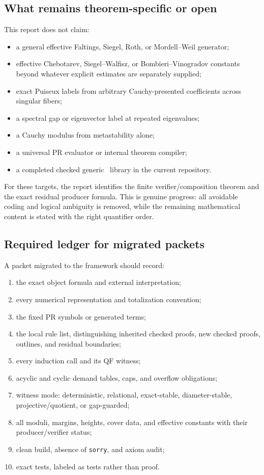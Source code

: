 \subsection{What remains theorem-specific or open}

This report does not claim:
\begin{itemize}
  \item a general effective Faltings, Siegel, Roth, or Mordell--Weil generator;
  \item effective Chebotarev, Siegel--Walfisz, or Bombieri--Vinogradov constants beyond whatever explicit estimates are separately supplied;
  \item exact Puiseux labels from arbitrary Cauchy-presented coefficients across singular fibers;
  \item a spectral gap or eigenvector label at repeated eigenvalues;
  \item a Cauchy modulus from metastability alone;
  \item a universal PR evaluator or internal theorem compiler;
  \item a completed checked generic \KIFCR\ library in the current repository.
\end{itemize}
For these targets, the report identifies the finite verifier/composition theorem and the exact residual producer formula.  This is genuine progress: all avoidable coding and logical ambiguity is removed, while the remaining mathematical content is stated with the right quantifier order.

\subsection{Required ledger for migrated packets}

A packet migrated to the framework should record:
\begin{enumerate}[label=(\arabic*)]
  \item the exact object formula and external interpretation;
  \item every numerical representation and totalization convention;
  \item the fixed PR symbols or generated terms;
  \item the local rule list, distinguishing inherited checked proofs, new checked proofs, outlines, and residual boundaries;
  \item every induction call and its QF witness;
  \item acyclic and cyclic demand tables, caps, and overflow obligations;
  \item witness mode: deterministic, relational, exact-stable, diameter-stable, projective/quotient, or gap-guarded;
  \item all moduli, margins, heights, cover data, and effective constants with their producer/verifier status;
  \item clean build, absence of \texttt{sorry}, and axiom audit;
  \item exact tests, labeled as tests rather than proof.
\end{enumerate}

